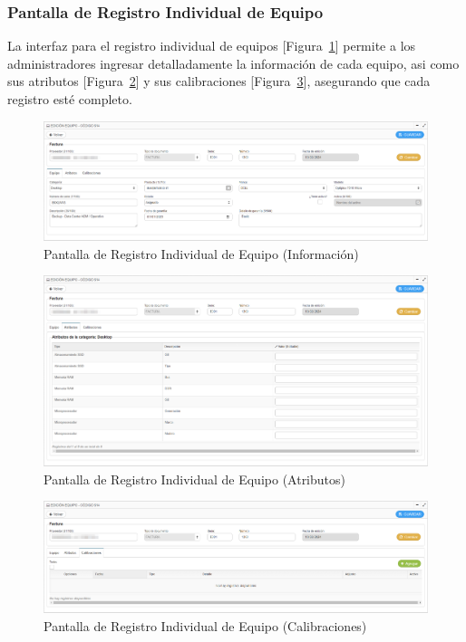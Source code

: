 \documentclass[stu, 12pt, letterpaper, donotrepeattitle, floatsintext, natbib]{apa7}
\begin{document}
\subsubsection{Pantalla de Registro Individual de Equipo}
La interfaz para el registro individual de equipos [Figura~\ref{datosEquipo}] permite a los administradores ingresar detalladamente la informaci\'on de cada equipo, asi como sus atributos [Figura~\ref{atributosEquipo}] y sus calibraciones [Figura~\ref{calibracionesEquipo}], asegurando que cada registro est\'e completo.
\begin{figure}[H]
    \centering
    \caption{Pantalla de Registro Individual de Equipo (Informaci\'on)}\label{datosEquipo}
    \includegraphics[width=16.5cm]{./images/datosEquipo.png}
\end{figure}
\begin{figure}[H]
    \centering
    \caption{Pantalla de Registro Individual de Equipo (Atributos)}\label{atributosEquipo}
    \includegraphics[width=16.5cm]{./images/equipoAtributos.png}
\end{figure}
\begin{figure}[H]
    \centering
    \caption{Pantalla de Registro Individual de Equipo (Calibraciones)}\label{calibracionesEquipo}
    \includegraphics[width=16.5cm]{./images/calibracionesEquipo.png}
\end{figure}
\end{document}
